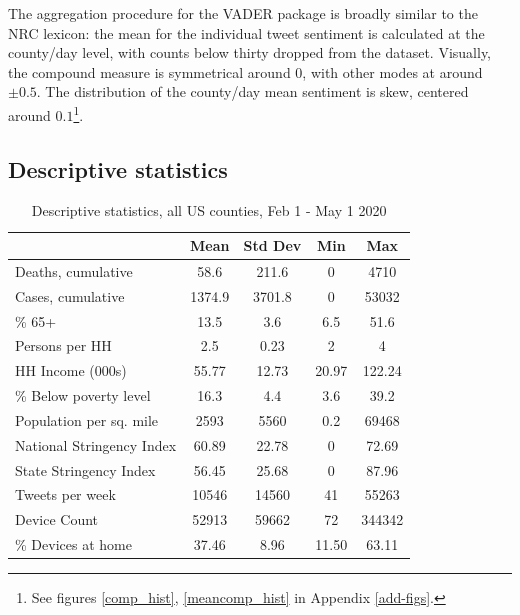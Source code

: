 \documentclass{article}
\begin{document}
The aggregation procedure for the VADER package is broadly similar to the NRC lexicon: the mean for the individual tweet sentiment is calculated at the county/day level, with counts below thirty dropped from the dataset. Visually, the compound measure is symmetrical around 0, with other modes at around \(\pm 0.5\). The distribution of the county/day mean sentiment is skew, centered around \(0.1\)\footnote{See figures \ref{comp_hist}, \ref{meancomp_hist} in Appendix \ref{add-figs}.}.

\subsection{Descriptive statistics}\label{descrip}
\begin{singlespace}
    \begin{table}[!htb]
    \centering  
  \caption{Descriptive statistics, all US counties, Feb 1 - May 1 2020}
  \begin{tabular}{lcccc}
    \toprule
     & Mean & Std Dev & Min & Max\\
    \midrule
    Deaths, cumulative & 58.6 & 211.6 & 0 & 4710\\
    Cases, cumulative & 1374.9 & 3701.8 & 0 & 53032\\
    \addlinespace
    \% 65+ & 13.5 & 3.6 & 6.5 & 51.6\\
    Persons per HH & 2.5 & 0.23 & 2 & 4\\
    HH Income (000s) & 55.77 & 12.73 & 20.97 & 122.24\\
    \% Below poverty level & 16.3 & 4.4 & 3.6 & 39.2\\
    Population per sq. mile & 2593 & 5560 & 0.2 & 69468\\
    \addlinespace
    National Stringency Index & 60.89 & 22.78 & 0 & 72.69\\
    State Stringency Index & 56.45 & 25.68 & 0 & 87.96\\
    \addlinespace
    Tweets per week & 10546 & 14560 & 41 & 55263\\
    \addlinespace
    Device Count & 52913 & 59662 & 72 & 344342\\
    \% Devices at home & 37.46 & 8.96 & 11.50 & 63.11\\
    \bottomrule
    \end{tabular}
  \end{table}
\end{singlespace}
\end{document}
